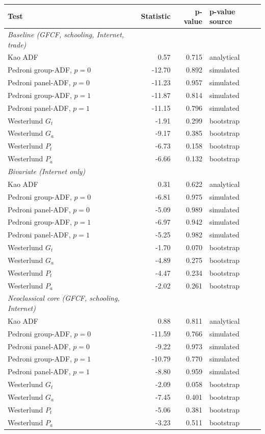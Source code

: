 \begin{tabular}{lrrl}\toprule
Test & Statistic & p-value & p-value source \\
\midrule
\textit{Baseline (GFCF, schooling, Internet, trade)} &  &  &  \\
Kao ADF & 0.57 & 0.715 & analytical \\
Pedroni group-ADF, $p=0$ & -12.70 & 0.892 & simulated \\
Pedroni panel-ADF, $p=0$ & -11.23 & 0.957 & simulated \\
Pedroni group-ADF, $p=1$ & -11.87 & 0.814 & simulated \\
Pedroni panel-ADF, $p=1$ & -11.15 & 0.796 & simulated \\
Westerlund $G_t$ & -1.91 & 0.299 & bootstrap \\
Westerlund $G_a$ & -9.17 & 0.385 & bootstrap \\
Westerlund $P_t$ & -6.73 & 0.158 & bootstrap \\
Westerlund $P_a$ & -6.66 & 0.132 & bootstrap \\
\textit{Bivariate (Internet only)} &  &  &  \\
Kao ADF & 0.31 & 0.622 & analytical \\
Pedroni group-ADF, $p=0$ & -6.81 & 0.975 & simulated \\
Pedroni panel-ADF, $p=0$ & -5.09 & 0.989 & simulated \\
Pedroni group-ADF, $p=1$ & -6.97 & 0.942 & simulated \\
Pedroni panel-ADF, $p=1$ & -5.25 & 0.982 & simulated \\
Westerlund $G_t$ & -1.70 & 0.070 & bootstrap \\
Westerlund $G_a$ & -4.89 & 0.275 & bootstrap \\
Westerlund $P_t$ & -4.47 & 0.234 & bootstrap \\
Westerlund $P_a$ & -2.02 & 0.261 & bootstrap \\
\textit{Neoclassical core (GFCF, schooling, Internet)} &  &  &  \\
Kao ADF & 0.88 & 0.811 & analytical \\
Pedroni group-ADF, $p=0$ & -11.59 & 0.766 & simulated \\
Pedroni panel-ADF, $p=0$ & -9.22 & 0.973 & simulated \\
Pedroni group-ADF, $p=1$ & -10.79 & 0.770 & simulated \\
Pedroni panel-ADF, $p=1$ & -8.80 & 0.959 & simulated \\
Westerlund $G_t$ & -2.09 & 0.058 & bootstrap \\
Westerlund $G_a$ & -7.45 & 0.401 & bootstrap \\
Westerlund $P_t$ & -5.06 & 0.381 & bootstrap \\
Westerlund $P_a$ & -3.23 & 0.511 & bootstrap \\
\bottomrule\end{tabular}
